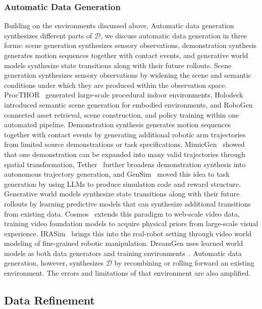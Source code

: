 \documentclass[acmsmall,screen,review]{acmart}
\begin{document}
\subsubsection{Automatic Data Generation}\label{sec:auto_data_gen}

Building on the environments discussed above,
Automatic data generation synthesizes different parts of \(\mathcal{D}\), 
we discuss automatic data generation in three forms: scene generation synthesizes sensory observations, 
demonstration synthesis generates motion sequences together with contact events, and generative world models synthesize state transitions along with their future rollouts.
Scene generation synthesizes sensory observations by widening the scene and semantic conditions under which they are produced within the observation space.
ProcTHOR~\cite{deitke2022procthor} generated large-scale procedural indoor environments, 
Holodeck~\cite{yang2024holodeck} introduced semantic scene generation for embodied environments,
and RoboGen~\cite{wang2024robogen} connected asset retrieval, scene construction, and policy training within one automated pipeline.
Demonstration synthesis generates motion sequences together with contact events by generating additional robotic arm trajectories from limited source demonstrations or task specifications.
MimicGen~\cite{mandlekar2023mimicgen} showed that one demonstration can be expanded into many valid trajectories through spatial transformation, 
Tether~\cite{liang2026tether} further broadens demonstration synthesis into autonomous trajectory generation,
and GenSim~\cite{wang2024gensim} moved this idea to task generation by using LLMs to produce simulation code and reward structure.
Generative world models synthesize state transitions along with their future rollouts by learning predictive models that can synthesize additional transitions from existing data.
Cosmos~\cite{nvidia2025cosmos} extends this paradigm to web-scale video data, training video foundation models to acquire physical priors from large-scale visual experience.
IRASim~\cite{zhu2025irasim} brings this into the real-robot setting through video world modeling of fine-grained robotic manipulation.
DreamGen uses learned world models as both data generators and training environments~\cite{jang2025dreamge}. 
Automatic data generation, however, synthesizes \(\mathcal{D}\) by recombining or rolling forward an existing environment. 
The errors and limitations of that environment are also amplified.

\subsection{Data Refinement}\label{sec:data_refinement}
\end{document}
